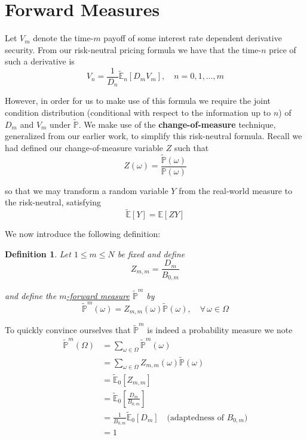 \documentclass[12pt]{article}
\newtheorem{definition}{Definition}
\newlength\tindent
\renewcommand{\indent}{\hspace*{\tindent}}
\renewcommand{\P}{\mathbb P}
\newcommand{\E}{\mathbb E}
\begin{document}
\section{Forward Measures}

Let $V_m$ denote the time-$m$ payoff of some interest rate dependent derivative security. From our risk-neutral pricing formula we have that the time-$n$ price of such a derivative is
\begin{equation*}
	V_n = \frac{1}{D_n} \tilde{\E}_n \left[ D_mV_m \right],\quad n = 0,1,...,m
\end{equation*}

\indent However, in order for us to make use of this formula we require the joint condition distribution (conditional with respect to the information up to $n$) of $D_m$ and $V_m$ under $\tilde{\P}$. We make use of the {\bf change-of-measure} technique, generalized from our earlier work, to simplify this risk-neutral formula. Recall we had defined our change-of-measure variable $Z$ such that 
\begin{equation*}
	Z(\omega) = \frac{ \tilde{\P}(\omega) }{ \P(\omega) }
\end{equation*}

so that we may transform a random variable $Y$ from the real-world measure to the risk-neutral, satisfying
\begin{equation*}
	\tilde{\E}[Y] = \E[ZY]
\end{equation*} 

We now introduce the following definition: \\

\begin{definition} Let $1 \leq m \leq N$ be fixed and define
\begin{equation*}
	Z_{m,m} = \frac{ D_m }{ B_{0,m} }
\end{equation*}

and define the \underline{$m$-forward measure} $\tilde{\P}^m$ by
\begin{equation*}
	\tilde{\P}^m(\omega) = Z_{m,m}(\omega)\tilde{\P}(\omega),\quad\forall\,\omega\in\Omega
\end{equation*}
\end{definition}

To quickly convince ourselves that $\tilde{\P}^m$ is indeed a probability measure we note
\begin{align*}
	\tilde{\P}^m(\Omega) &= \sum_{\omega\in\Omega} \tilde{\P}^m(\omega) \\
	&= \sum_{\omega\in\Omega} Z_{m,m}(\omega)\tilde{\P}(\omega) \\
	&= \tilde{\E}_0 \left[ Z_{m,m} \right] \\
	&= \tilde{\E}_0 \left[ \frac{D_m}{B_{0,m}} \right] \\
	&= \frac{1}{B_{0,m}} \tilde{\E}_0 [D_m] \quad \text{(adaptedness of $B_{0,m}$)} \\
	&= 1
\end{align*}
\end{document}
